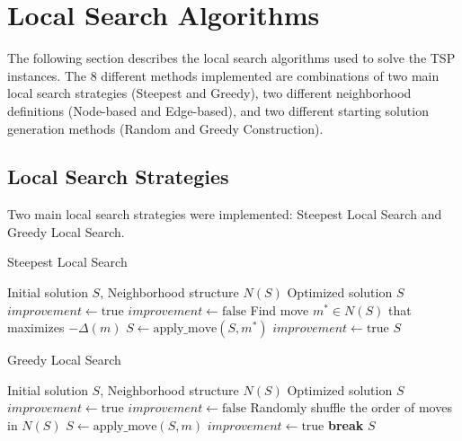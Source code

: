 \section{Local Search Algorithms}

The following section describes the local search algorithms used to solve the TSP instances. The 8 different methods implemented are combinations of two main local search strategies (Steepest and Greedy), two different neighborhood definitions (Node-based and Edge-based), and two different starting solution generation methods (Random and Greedy Construction).

\subsection{Local Search Strategies}

Two main local search strategies were implemented: Steepest Local Search and Greedy Local Search.

\begin{algorithm}
\caption{Steepest Local Search}
\label{alg:steepest_ls}
\begin{algorithmic}[1]
\Require Initial solution $S$, Neighborhood structure $N(S)$
\Ensure Optimized solution $S$
\State $improvement \gets \text{true}$
    \State $improvement \gets \text{false}$
    \State Find move $m^* \in N(S)$ that maximizes $-\Delta(m)$
        \State $S \gets \text{apply\_move}(S, m^*)$
        \State $improvement \gets \text{true}$
    \EndIf
\EndWhile
\State \Return $S$
\end{algorithmic}
\end{algorithm}

\begin{algorithm}
\caption{Greedy Local Search}
\label{alg:greedy_ls}
\begin{algorithmic}[1]
\Require Initial solution $S$, Neighborhood structure $N(S)$
\Ensure Optimized solution $S$
\State $improvement \gets \text{true}$
    \State $improvement \gets \text{false}$
    \State Randomly shuffle the order of moves in $N(S)$
            \State $S \gets \text{apply\_move}(S, m)$
            \State $improvement \gets \text{true}$
            \State \textbf{break}
        \EndIf
    \EndFor
\EndWhile
\State \Return $S$
\end{algorithmic}
\end{algorithm}

